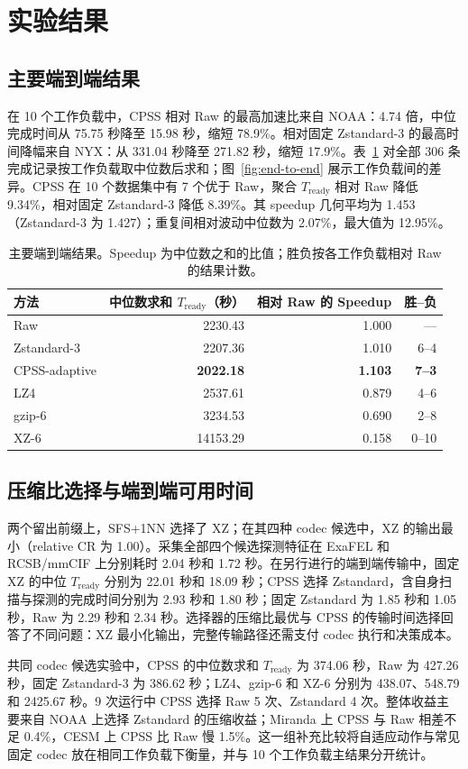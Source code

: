 \documentclass[smallabstract,smallcaptions]{dccpaper}
\renewcommand{\Section}[1]{\vspace*{-0.05in}\section{#1}\vspace{0.025in}}
\renewcommand{\SubSection}[1]{\vspace*{-0.125in}\subsection{#1}}
\begin{document}
\FloatBarrier
\Section{实验结果}

\SubSection{主要端到端结果}
在 10 个工作负载中，CPSS 相对 Raw 的最高加速比来自 NOAA：4.74 倍，中位完成时间从 75.75 秒降至 15.98 秒，缩短 78.9\%。相对固定 Zstandard-3 的最高时间降幅来自 NYX：从 331.04 秒降至 271.82 秒，缩短 17.9\%。表~\ref{tab:main-results} 对全部 306 条完成记录按工作负载取中位数后求和；图~\ref{fig:end-to-end} 展示工作负载间的差异。CPSS 在 10 个数据集中有 7 个优于 Raw，聚合 $T_{\mathrm{ready}}$ 相对 Raw 降低 9.34\%，相对固定 Zstandard-3 降低 8.39\%。其 speedup 几何平均为 1.453（Zstandard-3 为 1.427）；重复间相对波动中位数为 2.07\%，最大值为 12.95\%。

\begin{table}[t]
\centering
\caption{主要端到端结果。Speedup 为中位数之和的比值；胜负按各工作负载相对 Raw 的结果计数。}
\label{tab:main-results}
\vspace{0.06in}
\small
\begin{tabular}{lrrr}
\toprule
方法 & 中位数求和 $T_{\mathrm{ready}}$（秒） & 相对 Raw 的 Speedup & 胜--负 \\
\midrule
Raw & 2230.43 & 1.000 & --- \\
Zstandard-3 & 2207.36 & 1.010 & 6--4 \\
CPSS-adaptive & \textbf{2022.18} & \textbf{1.103} & \textbf{7--3} \\
LZ4 & 2537.61 & 0.879 & 4--6 \\
gzip-6 & 3234.53 & 0.690 & 2--8 \\
XZ-6 & 14153.29 & 0.158 & 0--10 \\
\bottomrule
\end{tabular}
\end{table}

\SubSection{压缩比选择与端到端可用时间}
两个留出前缀上，SFS+1NN 选择了 XZ；在其四种 codec 候选中，XZ 的输出最小（relative CR 为 1.00）。采集全部四个候选探测特征在 ExaFEL 和 RCSB/mmCIF 上分别耗时 2.04 秒和 1.72 秒。在另行进行的端到端传输中，固定 XZ 的中位 $T_{\mathrm{ready}}$ 分别为 22.01 秒和 18.09 秒；CPSS 选择 Zstandard，含自身扫描与探测的完成时间分别为 2.93 秒和 1.80 秒；固定 Zstandard 为 1.85 秒和 1.05 秒，Raw 为 2.29 秒和 2.34 秒。选择器的压缩比最优与 CPSS 的传输时间选择回答了不同问题：XZ 最小化输出，完整传输路径还需支付 codec 执行和决策成本。

共同 codec 候选实验中，CPSS 的中位数求和 $T_{\mathrm{ready}}$ 为 374.06 秒，Raw 为 427.26 秒，固定 Zstandard-3 为 386.62 秒；LZ4、gzip-6 和 XZ-6 分别为 438.07、548.79 和 2425.67 秒。9 次运行中 CPSS 选择 Raw 5 次、Zstandard 4 次。整体收益主要来自 NOAA 上选择 Zstandard 的压缩收益；Miranda 上 CPSS 与 Raw 相差不足 0.4\%，CESM 上 CPSS 比 Raw 慢 1.5\%。这一组补充比较将自适应动作与常见固定 codec 放在相同工作负载下衡量，并与 10 个工作负载主结果分开统计。
\end{document}
